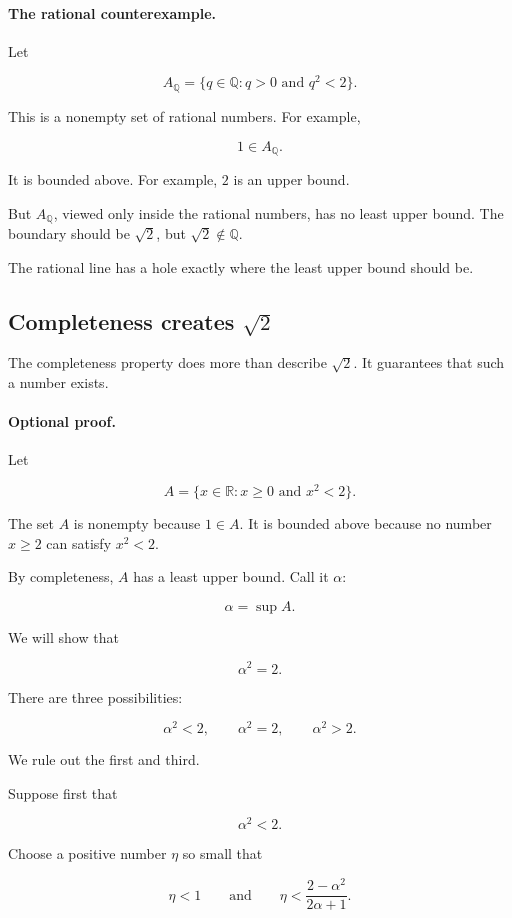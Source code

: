\paragraph{The rational counterexample.}
Let

\[
A_{\mathbb Q}=\{q\in\mathbb Q:q>0 \text{ and } q^2<2\}.
\]

This is a nonempty set of rational numbers. For example,

\[
1\in A_{\mathbb Q}.
\]

It is bounded above. For example, \(2\) is an upper bound.

But \(A_{\mathbb Q}\), viewed only inside the rational numbers, has no least upper bound. The boundary should be \(\sqrt2\), but \(\sqrt2\notin\mathbb Q\).

The rational line has a hole exactly where the least upper bound should be.

\subsection{Completeness creates \(\sqrt2\)}
\label{subsec:completeness-creates-sqrt2}

The completeness property does more than describe \(\sqrt2\). It guarantees that such a number exists.

\paragraph{Optional proof.}
Let

\[
A=\{x\in\mathbb R:x\ge 0 \text{ and } x^2<2\}.
\]

The set \(A\) is nonempty because \(1\in A\). It is bounded above because no number \(x\ge 2\) can satisfy \(x^2<2\).

By completeness, \(A\) has a least upper bound. Call it \(\alpha\):

\[
\alpha=\sup A.
\]

We will show that

\[
\alpha^2=2.
\]

There are three possibilities:

\[
\alpha^2<2,\qquad \alpha^2=2,\qquad \alpha^2>2.
\]

We rule out the first and third.

Suppose first that

\[
\alpha^2<2.
\]

Choose a positive number \(\eta\) so small that

\[
\eta<1
\qquad\text{and}\qquad
\eta<\frac{2-\alpha^2}{2\alpha+1}.
\]

